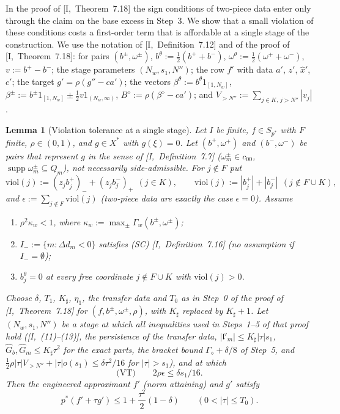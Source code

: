 \documentclass[10pt]{amsart}
\newtheorem{lemma}[theorem]{Lemma}
\theoremstyle{definition}
\theoremstyle{remark}
\newcommand{\supp}{\operatorname{supp}}
\newcommand{\lin}{\mathfrak l}
\begin{document}
In the proof of [I,~Theorem~7.18] the sign conditions of two-piece data enter
only through the claim on the base excess in Step~3.  We show that a small
violation of these conditions costs a first-order term that is affordable at
a single stage of the construction.  We use the notation of
[I,~Definition~7.12] and of the proof of [I,~Theorem~7.18]: for pairs
$(b^\pm,\omega^\pm)$, $b^\theta:=\frac12(b^++b^-)$, $\omega^\theta:=\frac12
(\omega^++\omega^-)$, $v:=b^+-b^-$; the stage parameters $(N_w,s_1,N'')$; the
row $f'$ with data $a'$, $z'$, $\hat x'$, $c'$; the target $g'=\rho(g''-ca')$;
the vectors $\beta^\theta:=b^\theta1_{[1,N_w]}$,
$\beta^\pm:=b^\pm1_{[1,N_w]}\pm\frac12v1_{(N_w,\infty)}$, $B^\diamond:=
\rho(\beta^\diamond-ca')$; and $V_{>N''}:=\sum_{j\in K,\,j>N''}|v_j|$.

\begin{lemma}[Violation tolerance at a single stage]\label{lem:II-VT}
Let $I$ be finite, $f\in S_{p^*}$ with $F$ finite, $\rho\in(0,1)$, and
$g\in X^*$ with $g(\xi)=0$.  Let $(b^+,\omega^+)$ and $(b^-,\omega^-)$ be
pairs that represent $g$ in the sense of [I,~Definition~7.7]
\textup{(}$\omega^\pm_m\in c_{00}$, $\supp\omega^\pm_m\subseteq Q_m$\textup{)},
not necessarily side-admissible.  For $j\notin F$ put
\[
 \mathrm{viol}(j):=(z_jb^+_j)_-+(z_jb^-_j)_+\ \ (j\in K),\qquad
 \mathrm{viol}(j):=|b^+_j|+|b^-_j|\ \ (j\notin F\cup K),
\]
and $\epsilon:=\sum_{j\notin F}\mathrm{viol}(j)$ \textup{(}two-piece data are
exactly the case $\epsilon=0$\textup{)}.  Assume
\begin{enumerate}
\item[(V1)] $\rho^2\kappa_w<1$, where $\kappa_w:=\max_\pm\Gamma_w(b^\pm,
\omega^\pm)$;
\item[(V2)] $I_-:=\{m:\Delta d_m<0\}$ satisfies \textup{(SC)}
[I,~Definition~7.16] \textup{(}no assumption if $I_-=\emptyset$\textup{)};
\item[(V3)] $b^\theta_j=0$ at every free coordinate $j\notin F\cup K$ with
$\mathrm{viol}(j)>0$.
\end{enumerate}
Choose $\delta$, $T_1$, $K_\sharp$, $\eta_1$, the transfer data and $T_0$ as in
Step~0 of the proof of [I,~Theorem~7.18] for $(f,b^\pm,\omega^\pm,\rho)$, with
$K_\sharp$ replaced by $K_\sharp+1$.  Let $(N_w,s_1,N'')$ be a stage at which
all inequalities used in Steps~1--5 of that proof hold \textup{(}[I,~(11)--(13)],
the persistence of the transfer data, $|\lin'_m|\le K_\sharp|\tau|s_1$,
$\hat G_b,\hat G_m\le K_\sharp\tau^2$ for the exact parts, the bracket bound
$\Gamma_\diamond+\delta/8$ of Step~5, and $\frac12\rho|\tau|V_{>N''}+|\tau|o(s_1)
\le\delta\tau^2/16$ for $|\tau|>s_1$\textup{)}, and at which
\[
 \text{(VT)}\qquad 2\rho\epsilon\le\delta s_1/16 .
\]
Then the engineered approximant $f'$ \textup{(}norm attaining\textup{)} and
$g'$ satisfy
\[
 p^*(f'+\tau g')\le1+\frac{\tau^2}2(1-\delta)\qquad(0<|\tau|\le T_0).
\]
\end{lemma}
\end{document}
